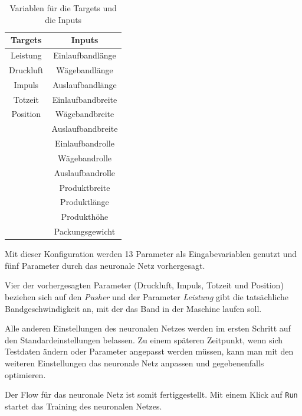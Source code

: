 \begin{table}[h]
    \centering
    \begin{tabular}{|c|c|}
        \hline
        \textbf{Targets} & \textbf{Inputs}\\
        \hline
        \hline
        Leistung & Einlaufbandlänge\\
        \hline
        Druckluft & Wägebandlänge\\
        \hline
        Impuls & Auslaufbandlänge\\
        \hline
        Totzeit & Einlaufbandbreite\\
        \hline
        Position & Wägebandbreite\\
        \hline
        & Auslaufbandbreite\\
        \hline
        & Einlaufbandrolle\\
        \hline
        & Wägebandrolle\\
        \hline
        & Auslaufbandrolle\\
        \hline
        & Produktbreite\\
        \hline
        & Produktlänge\\
        \hline
        & Produkthöhe\\
        \hline
        & Packungsgewicht\\
        \hline
    \end{tabular}
    \caption{Variablen für die Targets und die Inputs}
    \label{tab:targets_inputs}
\end{table}

Mit dieser Konfiguration werden 13 Parameter als Eingabevariablen genutzt und fünf Parameter durch das neuronale Netz
vorhergesagt.

Vier der vorhergesagten Parameter (Druckluft, Impuls, Totzeit und Position) beziehen sich auf den \textit{Pusher} und
der Parameter \textit{Leistung} gibt die tatsächliche Bandgeschwindigkeit an, mit der das Band in der Maschine laufen
soll.

Alle anderen Einstellungen des neuronalen Netzes werden im ersten Schritt auf den Standardeinstellungen belassen. Zu
einem späteren Zeitpunkt, wenn sich Testdaten ändern oder Parameter angepasst werden müssen, kann man mit den weiteren
Einstellungen das neuronale Netz anpassen und gegebenenfalls optimieren.

Der Flow für das neuronale Netz ist somit fertiggestellt. Mit einem Klick auf \texttt{Run} startet das Training des
neuronalen Netzes.


